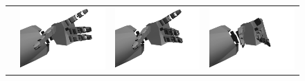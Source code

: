 \begin{figure}
\begin{tabular}{cc:c:c}
 & \includegraphics[width=\imgwidth]{images/eval_vicon/sequence/finger_movement/rep_105.png} & \includegraphics[width=\imgwidth]{images/eval_vicon/sequence/finger_movement/rep_133.png} & \includegraphics[width=\imgwidth]{images/eval_vicon/sequence/finger_movement/rep_152.png} \\

\end{tabular}
\end{figure}
